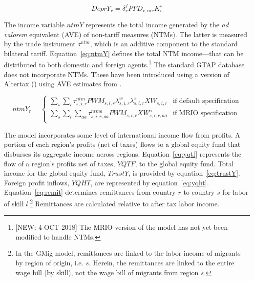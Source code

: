 \documentclass[11pt,letterpaper]{report}
\begin{document}
\begin{equation}
\label{eq:depry}
\mathit{DeprY_r} = \delta^f_r \mathit{PFD}_{r,inv} \mathit{K}^s_r
\end{equation}

The income variable $\mathit{ntmY}$ represents the total income
generated by the \emph{ad valorem} equivalent (AVE) of non-tariff measures (NTMs).
The latter is measured by the trade instrument $\tau^{\mathit{ntm}}$, which
is an additive component to the standard bilateral tariff. Equation~\ref{eq:ntmY}
defines the total NTM income---that can be distributed to both domestic
and foreign agents.\footnote{[NEW: 4-OCT-2018] The MRIO version of the model has not
yet been modified to handle NTMs.} The standard GTAP database does not
incorporate NTMs. These have been introduced using a version of Altertax (\cite{MalcolmGTAPTP12}) using
AVE estimates from \cite{Keeetal2009EconJ}.

\begin{equation}
\label{eq:ntmY}
\mathit{ntmY}_r =
\begin{cases}
   \sum_\mathit{s} {\sum_i{
      \tau^{\mathit{ntm}}_{s,i,r}  \mathit{PWM}_{s,i,r}
         \lambda^w_{s,i,r} \lambda^x_{s,i,r}\mathit{XW}_{s,i,r}
   }}
   & \textrm{if default specification} \\
   \sum_\mathit{s} {\sum_i{ \sum_{\mathit{aa}} {
      \tau^{\mathit{ntma}}_{s,i,r,\mathit{aa}} \mathit{PWM}_{s,i,r}
         \mathit{XW}^a_{s,i,r,\mathit{aa}}
   }}}
   & \textrm{if MRIO specification} \\
\end{cases}
\end{equation}

The model incorporates some level of international income flow from profits. A
portion of each region's profits (net of taxes) flows to a global equity fund
that disburses its aggregate income across regions. Equation~\ref{eq:yqtf}
represents the flow of a region's profits net of taxes, $\mathit{YQTF}$, to the
global equity fund. Total income for the global equity fund, $\mathit{TrustY}$,
is provided by equation~\ref{eq:trustY}. Foreign profit inflows,
$\mathit{YQHT}$, are represented by equation~\ref{eq:yqht}.
Equation~\ref{eq:remit} determines remittances from country $r$ to country $s$
for labor of skill $l$.\footnote{In the GMig model, remittances are linked to
the labor income of migrants by region of origin, i.e. $s$. Herein, the
remittances are linked to the entire wage bill (by skill), not the wage bill of
migrants from region $s$.} Remittances are calculated relative to after tax
labor income.
\end{document}
